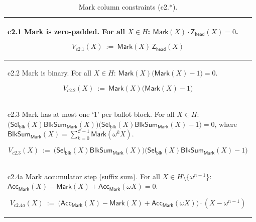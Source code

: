 \begin{table}[t]
\small
\setlength{\tabcolsep}{3pt}
\renewcommand{\arraystretch}{1.05}
\caption{Mark column constraints (c2.*).}
\label{tab:constraints-mark}
\begin{tabular}{@{}p{0.98\linewidth}@{}}
\toprule

c2.1 Mark is zero-padded. For all $X\in H$: $\mathsf{Mark}(X)\cdot \mathsf{Z}_{\mathsf{head}}(X)=0$.
\begin{mdframed}[linewidth=0.6pt,backgroundcolor=verylightpink,innerleftmargin=6pt,innerrightmargin=6pt,innertopmargin=4pt,innerbottommargin=4pt]
\[
V_{c2.1}(X)\ :=\ \mathsf{Mark}(X)\,\mathsf{Z}_{\mathsf{head}}(X)
\]
\end{mdframed}
\\[-2mm]
\midrule

c2.2 Mark is binary. For all $X\in H$: $\mathsf{Mark}(X)\bigl(\mathsf{Mark}(X)-1\bigr)=0$.
\begin{mdframed}[linewidth=0.6pt,backgroundcolor=verylightpink,innerleftmargin=6pt,innerrightmargin=6pt,innertopmargin=4pt,innerbottommargin=4pt]
\[
V_{c2.2}(X)\ :=\ \mathsf{Mark}(X)\bigl(\mathsf{Mark}(X)-1\bigr)
\]
\end{mdframed}
\\[-2mm]
\midrule

c2.3 Mark has at most one ‘1’ per ballot block. For all $X\in H$:
$\bigl(\mathsf{Sel}_{\mathsf{blk}}(X)\mathsf{BlkSum}_{\mathsf{Mark}}(X)\bigr)\bigl(\mathsf{Sel}_{\mathsf{blk}}(X)\mathsf{BlkSum}_{\mathsf{Mark}}(X)-1\bigr)=0$,
where $\mathsf{BlkSum}_{\mathsf{Mark}}(X)=\sum_{k=0}^{\mathcal{C}-1}\mathsf{Mark}(\omega^k X)$.
\begin{mdframed}[linewidth=0.6pt,backgroundcolor=verylightpink,innerleftmargin=6pt,innerrightmargin=6pt,innertopmargin=4pt,innerbottommargin=4pt]
\[
V_{c2.3}(X)\ :=\ \bigl(\mathsf{Sel}_{\mathsf{blk}}(X)\mathsf{BlkSum}_{\mathsf{Mark}}(X)\bigr)\bigl(\mathsf{Sel}_{\mathsf{blk}}(X)\mathsf{BlkSum}_{\mathsf{Mark}}(X)-1\bigr)
\]
\end{mdframed}
\\[-2mm]
\midrule

c2.4a Mark accumulator step (suffix sum). For all $X\in H\setminus\{\omega^{n-1}\}$:
$\mathsf{Acc}_{\mathsf{Mark}}(X)-\mathsf{Mark}(X)+\mathsf{Acc}_{\mathsf{Mark}}(\omega X)=0$.
\begin{mdframed}[linewidth=0.6pt,backgroundcolor=verylightpink,innerleftmargin=6pt,innerrightmargin=6pt,innertopmargin=4pt,innerbottommargin=4pt]
\[
V_{c2.4a}(X)\ :=\ \bigl(\mathsf{Acc}_{\mathsf{Mark}}(X)-\mathsf{Mark}(X)+\mathsf{Acc}_{\mathsf{Mark}}(\omega X)\bigr)\cdot(X-\omega^{n-1})
\]
\end{mdframed}
\\[-2mm]
\midrule


\end{tabular}
\end{table}
